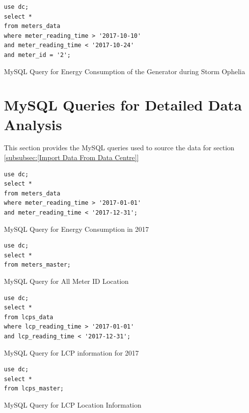 \documentclass[12pt]{scrartcl}
\begin{document}
\begin{listing}[H]
\begin{verbatim}
use dc; 
select * 
from meters_data
where meter_reading_time > '2017-10-10'
and meter_reading_time < '2017-10-24'
and meter_id = '2';
\end{verbatim}
\caption{MySQL Query for Energy Consumption of the Generator during Storm Ophelia}
\label{list:[MySQL Query for Energy Consumption of the Generator during Storm Ophelia]}
\end{listing}

\section{MySQL Queries for Detailed Data Analysis}
\label{sec:[Detailed MySQL Queries]}
This section provides the MySQL queries used to source the data for section \ref{subsubsec:[Import Data From Data Centre]}

\begin{listing}[H]
\begin{verbatim}
use dc; 
select * 
from meters_data
where meter_reading_time > '2017-01-01'
and meter_reading_time < '2017-12-31';
\end{verbatim}
\caption{MySQL Query for Energy Consumption in 2017}
\label{list:[MySQL Query for Energy Consumption in 2017]}
\end{listing}

\begin{listing}[H]
\begin{verbatim}
use dc; 
select * 
from meters_master;
\end{verbatim}
\caption{MySQL Query for All Meter ID Location}
\label{list:[MySQL Query for All Meter ID Location]}
\end{listing}

\begin{listing}[H]
\begin{verbatim}
use dc; 
select * 
from lcps_data
where lcp_reading_time > '2017-01-01'
and lcp_reading_time < '2017-12-31';
\end{verbatim}
\caption{MySQL Query for LCP information for 2017}
\label{list:[MySQL Query for LCP information for 2017]}
\end{listing}


\begin{listing}[H]
\begin{verbatim}
use dc; 
select * 
from lcps_master;
\end{verbatim}
\caption{MySQL Query for LCP Location Information}
\label{list:[MySQL Query for LCP Location Information]}
\end{listing}
\end{document}
